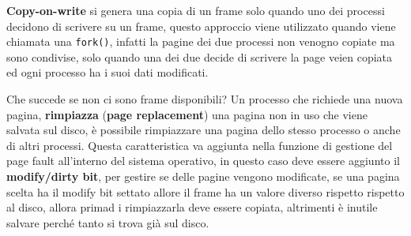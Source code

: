 \documentclass[12pt]{article}
\begin{document}
\textbf{Copy-on-write} si genera una copia di un frame solo quando uno dei processi decidono di scrivere su un frame, questo approccio viene utilizzato quando viene chiamata una \texttt{fork()}, infatti la pagine dei due processi non venogno copiate ma  sono condivise, solo quando una dei due decide di scrivere la page veien copiata ed ogni processo ha i suoi dati modificati.

\hfill

Che succede se non ci sono frame disponibili? Un processo che richiede una nuova pagina, \textbf{rimpiazza} (\textbf{page replacement}) una pagina non in uso che viene salvata sul disco, \`e possibile rimpiazzare una pagina dello stesso processo o anche di altri processi. Questa caratteristica va aggiunta nella funzione di gestione del page fault all'interno del sistema operativo, in questo caso deve essere aggiunto il \textbf{modify/dirty bit}, per gestire se delle pagine vengono modificate, se una pagina scelta ha il modify bit settato allore il frame ha un valore diverso rispetto rispetto al disco, allora primad i rimpiazzarla deve essere copiata, altrimenti \`e inutile salvare perch\'e tanto si trova gi\`a sul disco.
\end{document}
